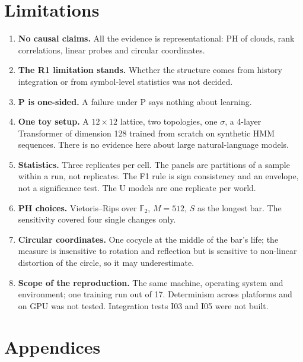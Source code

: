 \documentclass[12pt,a4paper]{article}
\newcommand{\en}[1]{\foreignlanguage{english}{#1}}   %
\newcommand{\chapterbreak}{\clearpage}
\let\oldsection\section
\renewcommand{\section}{\chapterbreak\oldsection}
\begin{document}
\section{Limitations}\label{sec:limits}
\begin{enumerate}[leftmargin=*]
\item \textbf{No causal claims.} All the evidence is representational: PH of clouds, rank correlations, linear \en{probes} and circular coordinates.
\item \textbf{The R1 limitation stands.} Whether the structure comes from history integration or from symbol-level statistics was not decided.
\item \textbf{P is one-sided.} A failure under P says nothing about learning.
\item \textbf{One toy setup.} A $12\times12$ lattice, two topologies, one $\sigma$, a 4-layer \en{Transformer} of dimension 128 trained from scratch on synthetic \en{HMM} sequences. There is no evidence here about large natural-language models.
\item \textbf{Statistics.} Three replicates per cell. The panels are partitions of a sample within a run, not replicates. The F1 rule is sign consistency and an envelope, not a significance test. The U models are one replicate per world.
\item \textbf{PH choices.} \en{Vietoris--Rips} over $\mathbb{F}_2$, $M=512$, $S$ as the longest bar. The sensitivity covered four single changes only.
\item \textbf{Circular coordinates.} One cocycle at the middle of the bar's life; the measure is insensitive to rotation and reflection but is sensitive to non-linear distortion of the circle, so it may underestimate.
\item \textbf{Scope of the reproduction.} The same machine, operating system and environment; one training run out of 17. Determinism across platforms and on \en{GPU} was not tested. Integration tests I03 and I05 were not built.
\end{enumerate}

\section{Appendices}\label{sec:appendix}
\end{document}
